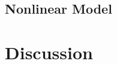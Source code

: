 \documentclass[onecolumn,draftcls]{IEEEtran}
\begin{document}
\subsection{Nonlinear Model}

\section{Discussion}

%
%

%
%
%
\end{document}
